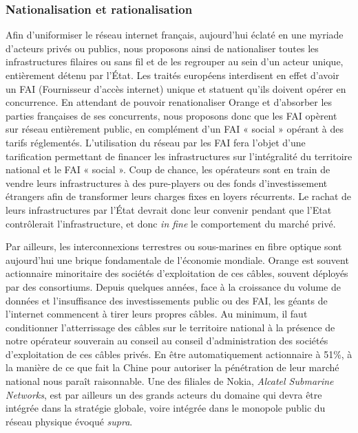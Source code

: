 \documentclass[a4paper]{article}
\begin{document}
\subsubsection{Nationalisation et rationalisation}

Afin d’uniformiser le réseau internet français, aujourd’hui éclaté en une myriade d’acteurs privés ou publics, nous proposons ainsi de nationaliser toutes les infrastructures filaires ou sans fil et de les regrouper au sein d’un acteur unique, entièrement détenu par l’État. Les traités européens interdisent en effet d’avoir un FAI (Fournisseur d’accès internet) unique et statuent qu’ils doivent opérer en concurrence. En attendant de pouvoir renationaliser Orange et d’absorber les parties françaises de ses concurrents, nous proposons donc que les FAI opèrent sur réseau entièrement public, en complément d’un FAI « social » opérant à des tarifs réglementés. L’utilisation du réseau par les FAI fera l’objet d’une tarification permettant de financer les infrastructures sur l’intégralité du territoire national et le FAI « social ». Coup de chance, les opérateurs sont en train de vendre leurs infrastructures à des pure-players ou des fonds d’investissement étrangers afin de transformer leurs charges fixes en loyers récurrents. Le rachat de leurs infrastructures par l’État devrait donc leur convenir pendant que l’Etat contrôlerait l’infrastructure, et donc \textit{in fine} le comportement du marché privé.

Par ailleurs, les interconnexions terrestres ou sous-marines en fibre optique sont aujourd’hui une brique fondamentale de l’économie mondiale. Orange est souvent actionnaire minoritaire des sociétés d’exploitation de ces câbles, souvent déployés par des consortiums. Depuis quelques années, face à la croissance du volume de données et l’insuffisance des investissements public ou des FAI, les géants de l’internet commencent à tirer leurs propres câbles. Au minimum, il faut conditionner l’atterrissage des câbles sur le territoire national à la présence de notre opérateur souverain au conseil au conseil d’administration des sociétés d’exploitation de ces câbles privés. En être automatiquement actionnaire à 51\%, à la manière de ce que fait la Chine pour autoriser la pénétration de leur marché national nous paraît raisonnable. Une des filiales de Nokia, \textit{Alcatel Submarine Networks}, est par ailleurs un des grands acteurs du domaine qui devra être intégrée dans la stratégie globale, voire intégrée dans le monopole public du réseau physique évoqué \textit{supra}.
\end{document}
